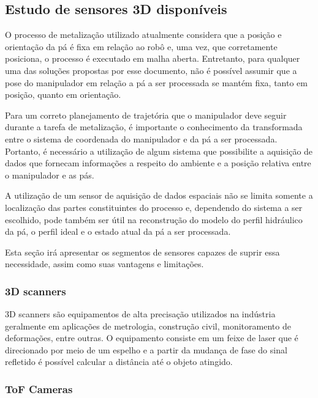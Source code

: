 \subsection{Estudo de sensores 3D disponíveis}

O processo de metalização utilizado atualmente considera que a posição e
orientação da pá é fixa em relação ao robô e, uma vez, que corretamente
posiciona, o processo é executado em malha aberta. Entretanto, para qualquer uma
das soluções propostas por esse documento, não é possível assumir que a pose
do manipulador em relação a pá a ser processada se mantém fixa, tanto em posição,
 quanto em orientação.

Para um correto planejamento de trajetória que o manipulador deve seguir durante
a tarefa de metalização, é importante o conhecimento da transformada entre o
sistema de coordenada do manipulador e da pá a ser processada. Portanto, é
necessário a utilização de algum sistema que possibilite a aquisição de dados
que fornecam informações a respeito do ambiente e a posição relativa entre o
manipulador e as pás.

A utilização de um sensor de aquisição de dados espaciais não se limita somente
a localização das partes constituintes do processo e, dependendo do sistema a
ser escolhido, pode também ser útil na reconstrução do modelo do perfil
hidráulico da pá, o perfil ideal e o estado atual da pá a ser processada.

Esta seção irá apresentar os segmentos de sensores capazes de suprir essa
necessidade, assim como suas vantagens e limitações. 


\subsubsection{3D scanners}

3D scanners são equipamentos de alta precisação utilizados na indústria
geralmente em aplicações de metrologia, construção civil, monitoramento de
deformações, entre outras. O equipamento consiste em um feixe de laser que é
direcionado por meio de um espelho e a partir da mudança de fase do sinal
refletido é possível calcular a distância até o objeto atingido.


\subsubsection{ToF Cameras}

